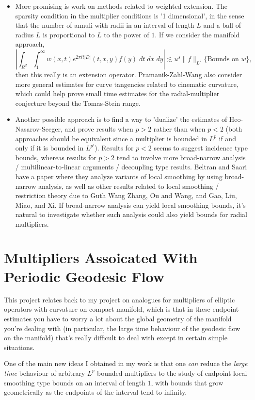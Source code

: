 \documentclass[11pt]{article}
\begin{document}
\begin{itemize}
    \item More promising is work on methods related to weighted extension. The sparsity condition in the multiplier conditions is '1 dimensional', in the sense that the number of annuli with radii in an interval of length $L$ and a ball of radius $L$ is proportional to $L$ to the power of $1$. If we consider the manifold approach, 
    \[ \left| \int_{R^d} \int_1^\infty w(x,t) e^{2 \pi i t |D|}(t,x,y) f(y)\; dt\; dx\; dy \right| \lesssim u^s \| f \|_{L^2} \{ \text{Bounds on $w$} \}, \]
    then this really is an extension operator. Pramanik-Zahl-Wang also consider more general estimates for curve tangencies related to cinematic curvature, which could help prove small time estimates for the radial-multiplier conjecture beyond the Tomas-Stein range.

    \item Another possible approach is to find a way to 'dualize' the estimates of Heo-Nasarov-Seeger, and prove results when $p > 2$ rather than when $p < 2$ (both approaches should be equivalent since a multiplier is bounded in $L^p$ if and only if it is bounded in $L^{p'}$). Results for $p < 2$ seems to suggest incidence type bounds, whereas results for $p > 2$ tend to involve more broad-narrow analysis / multilinear-to-linear arguments / decoupling type results. Beltran and Saari have a paper where they analyze variants of local smoothing by using broad-narrow analysis, as well as other results related to local smoothing / restriction theory due to Guth Wang Zhang, Ou and Wang, and Gao, Liu, Miao, and Xi. If broad-narrow analysis can yield local smoothing bounds, it's natural to investigate whether such analysis could also yield bounds for radial multipliers.
\end{itemize}

\section{Multipliers Assoicated With Periodic Geodesic Flow}

    This project relates back to my project on analogues for multipliers of elliptic operators with curvature on compact manifold, which is that in these endpoint estimates you have to worry a lot about the global geometry of the manifold you're dealing with (in particular, the large time behaviour of the geodesic flow on the manifold) that's really difficult to deal with except in certain simple situations.

    One of the main new ideas I obtained in my work is that one \emph{can} reduce the \emph{large time} behaviour of arbitrary $L^p$ bounded multipliers to the study of endpoint local smoothing type bounds on an interval of length $1$, with bounds that grow geometrically as the endpoints of the interval tend to infinity.
\end{document}
